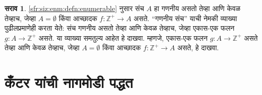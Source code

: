 \documentclass[11pt,a4paper,openany]{book}
\theoremstyle{definition}
\newtheorem{prob}{सराव}[chapter]
\newcommand{\PosInt}{\mathbb{Z}^{+}}
\begin{document}
\begin{prob}
  \ref{sfr:siz:enm:defn:enumerable} नुसार संच $A$ हा गणनीय
  असतो तेव्हा आणि केवळ तेव्हाच, जेव्हा $A = \emptyset$ किंवा
  आच्छादक $f\colon \PosInt \to A$ असते.
  ``गणनीय संच'' याची नेमकी व्याख्या पुढीलप्रमाणेही करता येते:
  संच गणनीय असतो तेव्हा आणि केवळ तेव्हाच, जेव्हा एकास-एक
  फलन $g\colon A \to \PosInt$ असते. या व्याख्या समतुल्य आहेत
  हे दाखवा. म्हणजे, एकास-एक फलन $g\colon A \to \PosInt$
  असते तेव्हा आणि केवळ तेव्हाच, जेव्हा $A = \emptyset$ किंवा
  आच्छादक $f\colon \PosInt \to A$ असते, हे दाखवा.
\end{prob}









\section{कँटर यांची नागमोडी पद्धत}\label{sfr:siz:zigzag:sec}
\end{document}
